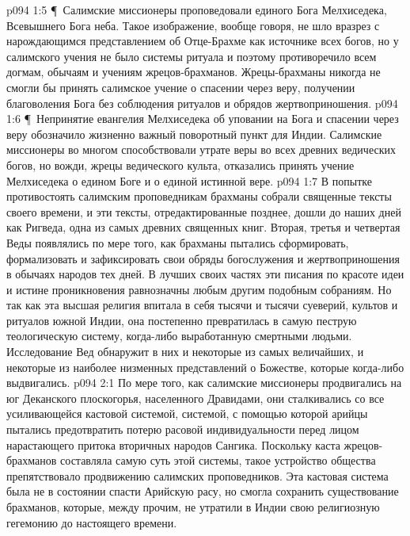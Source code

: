 \vs p094 1:5 \P\ Салимские миссионеры проповедовали единого Бога Мелхиседека, Всевышнего Бога неба. Такое изображение, вообще говоря, не шло вразрез с нарождающимся представлением об Отце\hyp{}Брахме как источнике всех богов, но у салимского учения не было системы ритуала и поэтому противоречило всем догмам, обычаям и учениям жрецов\hyp{}брахманов. Жрецы\hyp{}брахманы никогда не смогли бы принять салимское учение о спасении через веру, получении благоволения Бога без соблюдения ритуалов и обрядов жертвоприношения.
\vs p094 1:6 \P\ Непринятие евангелия Мелхиседека об уповании на Бога и спасении через веру обозначило жизненно важный поворотный пункт для Индии. Салимские миссионеры во многом способствовали утрате веры во всех древних ведических богов, но вожди, жрецы ведического культа, отказались принять учение Мелхиседека о едином Боге и о единой истинной вере.
\vs p094 1:7 В попытке противостоять салимским проповедникам брахманы собрали священные тексты своего времени, и эти тексты, отредактированные позднее, дошли до наших дней как Ригведа, одна из самых древних священных книг. Вторая, третья и четвертая Веды появлялись по мере того, как брахманы пытались сформировать, формализовать и зафиксировать свои обряды богослужения и жертвоприношения в обычаях народов тех дней. В лучших своих частях эти писания по красоте идеи и истине проникновения равнозначны любым другим подобным собраниям. Но так как эта высшая религия впитала в себя тысячи и тысячи суеверий, культов и ритуалов южной Индии, она постепенно превратилась в самую пеструю теологическую систему, когда\hyp{}либо выработанную смертными людьми. Исследование Вед обнаружит в них и некоторые из самых величайших, и некоторые из наиболее низменных представлений о Божестве, которые когда\hyp{}либо выдвигались.
\vs p094 2:1 По мере того, как салимские миссионеры продвигались на юг Деканского плоскогорья, населенного Дравидами, они сталкивались со все усиливающейся кастовой системой, системой, с помощью которой арийцы пытались предотвратить потерю расовой индивидуальности перед лицом нарастающего притока вторичных народов Сангика. Поскольку каста жрецов\hyp{}брахманов составляла самую суть этой системы, такое устройство общества препятствовало продвижению салимских проповедников. Эта кастовая система была не в состоянии спасти Арийскую расу, но смогла сохранить существование брахманов, которые, между прочим, не утратили в Индии свою религиозную гегемонию до настоящего времени.
